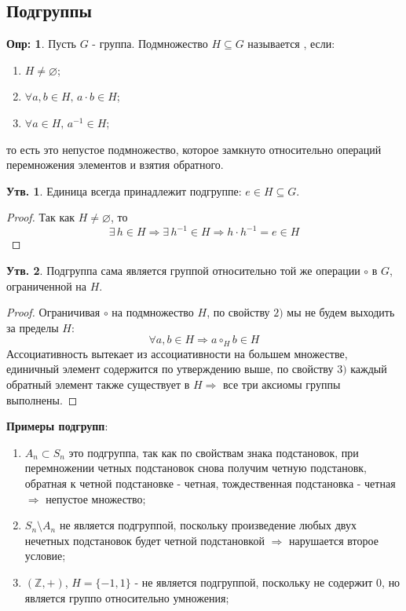 \documentclass[12pt]{article}
\newcommand{\MZ}{\mathbb{Z}}
\newcommand{\VN}{\varnothing}
\theoremstyle{definition}
\newtheorem{defn}{Опр:}
\newtheorem{prop}{Утв.}
\begin{document}
\subsection*{Подгруппы}

\begin{defn}
	Пусть $G$ - группа. Подмножество $H\subseteq G$ называется , если:
	\begin{enumerate}[label=\arabic*)]
		\item $H \neq \VN$;
		\item $\forall a,b \in H,\, a {\cdot}b \in H$;
		\item $\forall a \in H, \, a^{-1} \in H$;
	\end{enumerate}
	то есть это непустое подмножество, которое замкнуто относительно операций перемножения элементов и взятия обратного.
\end{defn}

\begin{prop}
	Единица всегда принадлежит подгруппе: $e \in H \subseteq G$.
\end{prop}
\begin{proof}
	Так как $H \neq \VN$, то 
	$$
		\exists \, h \in H \Rightarrow \exists \, h^{-1} \in H \Rightarrow h\cdot h^{-1} = e \in H
	$$
\end{proof}
\begin{prop}
	Подгруппа сама является группой относительно той же операции $\circ$ в $G$, ограниченной на $H$.
\end{prop}
\begin{proof}
	Ограничивая $\circ$ на подмножество $H$, по свойству $2)$ мы не будем выходить за пределы $H$:
	$$
		\forall a,b \in H \Rightarrow a{\circ_H}b \in H
	$$
	Ассоциативность вытекает из ассоциативности на большем множестве, единичный элемент содержится по утверждению выше, по свойству $3)$ каждый обратный элемент также существует в $H \Rightarrow$ все три аксиомы группы выполнены.
\end{proof}

\textbf{Примеры подгрупп}:
\begin{enumerate}[label=\arabic*)]
	\item {} $A_n \subset S_n$ это подгруппа, так как по свойствам знака подстановок, при перемножении четных подстановок снова получим четную подстановк, обратная к четной подстановке - четная, тождественная подстановка - четная $\Rightarrow$ непустое множество;
	
	\item {} $S_n \setminus A_n$ не является подгруппой, поскольку произведение любых двух нечетных подстановок будет четной подстановкой $\Rightarrow$ нарушается второе условие;
	
	\item $(\MZ,+)$, $H = \{-1,1\}$ - не является подгруппой, поскольку не содержит $0$, но является группо относительно умножения;
\end{enumerate}
\end{document}
